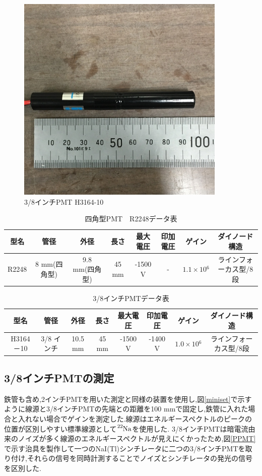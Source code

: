 \begin{figure}[tbp]
	\centering
		\includegraphics[width=10cm]{fig/iguchi/miniPMT.jpg}
	\caption{3/8インチPMT H3164-10}
	\label{3/8inch}
\end{figure}


\begin{table}[tbp]
	\centering
	  \begin{tabular}{cccccccc} \hline
		型名& 管径 & 外径 & 長さ & 最大電圧 & 印加電圧 & ゲイン & ダイノード構造 \\ \hline \hline
		R2248 & 8 mm(四角型) & 9.8 mm(四角型)& 45 mm & -1500 V & - & $1.1\times10{^{6}}$ &ラインフォーカス型/8段 \\ \hline
	\end{tabular}
	  \caption{四角型PMT　R2248データ表}
	  \label{R2248data}
\end{table}

\begin{table}[tbp]
	\centering
	
	  \begin{tabular}{cccccccc} \hline
		型名& 管径 & 外径 & 長さ & 最大電圧 & 印加電圧 & ゲイン & ダイノード構造 \\ \hline \hline
		H3164－10 & 3/8 インチ & 10.5 mm & 45 mm & -1500 V & -1400 V & $1.0\times10{^{6}}$ &ラインフォーカス型/8段　\\ \hline
	\end{tabular}
	  \caption{3/8インチPMTデータ表}
	  \label{3/8inchPMT}
\end{table}

\subsection{3/8インチPMTの測定}
鉄管も含め,2インチPMTを用いた測定と同様の装置を使用し,図\ref{miniset}で示すように線源と3/8インチPMTの先端との距離を100 mmで固定し,鉄管に入れた場合と入れない場合でゲインを測定した.線源はエネルギースペクトルのピークの位置が区別しやすい標準線源として$\ce{^{22}Na}$を使用した.
3/8インチPMTは暗電流由来のノイズが多く線源のエネルギースペクトルが見えにくかったため,図\ref{PPMT}で示す治具を製作して一つのNaI(Tl)シンチレータに二つの3/8インチPMTを取り付け,それらの信号を同時計測することでノイズとシンチレータの発光の信号を区別した.

